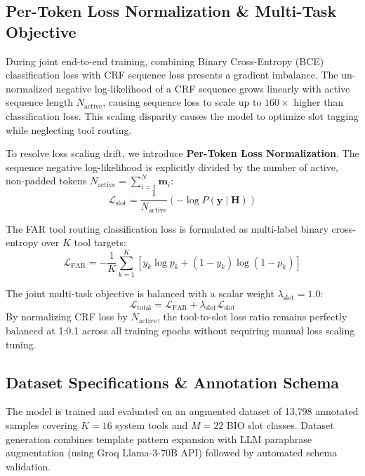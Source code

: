 \documentclass[letterpaper]{article} %
\begin{document}
\subsection{Per-Token Loss Normalization \& Multi-Task Objective}
During joint end-to-end training, combining Binary Cross-Entropy (BCE) classification loss with CRF sequence loss presents a gradient imbalance. The un-normalized negative log-likelihood of a CRF sequence grows linearly with active sequence length $N_{\text{active}}$, causing sequence loss to scale up to $160\times$ higher than classification loss. This scaling disparity causes the model to optimize slot tagging while neglecting tool routing.

To resolve loss scaling drift, we introduce \textbf{Per-Token Loss Normalization}. The sequence negative log-likelihood is explicitly divided by the number of active, non-padded tokens $N_{\text{active}} = \sum_{i=1}^N \mathbf{m}_i$:
\begin{equation}
    \mathcal{L}_{\text{slot}} = \frac{1}{N_{\text{active}}} \left( -\log P(\mathbf{y} \mid \mathbf{H}) \right)
\end{equation}

The FAR tool routing classification loss is formulated as multi-label binary cross-entropy over $K$ tool targets:
\begin{equation}
    \mathcal{L}_{\text{FAR}} = -\frac{1}{K} \sum_{k=1}^K \left[ y_k \log p_k + (1 - y_k) \log (1 - p_k) \right]
\end{equation}

The joint multi-task objective is balanced with a scalar weight $\lambda_{\text{slot}} = 1.0$:
\begin{equation}
    \mathcal{L}_{\text{total}} = \mathcal{L}_{\text{FAR}} + \lambda_{\text{slot}} \mathcal{L}_{\text{slot}}
\end{equation}
By normalizing CRF loss by $N_{\text{active}}$, the tool-to-slot loss ratio remains perfectly balanced at 1:0.1 across all training epochs without requiring manual loss scaling tuning.

\subsection{Dataset Specifications \& Annotation Schema}

The model is trained and evaluated on an augmented dataset of 13,798 annotated samples covering $K=16$ system tools and $M=22$ BIO slot classes. Dataset generation combines template pattern expansion with LLM paraphrase augmentation (using Groq Llama-3-70B API) followed by automated schema validation.
\end{document}
